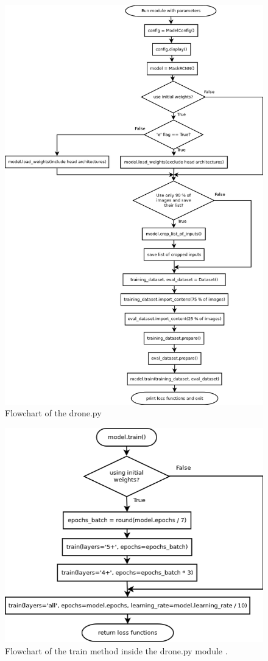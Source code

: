 \begin{figure}[H]
  \centering
  \includegraphics[width=0.8\linewidth]{images/drone-graph.png}
  \caption{Flowchart of the drone.py}
 \end{figure}
 \label{fig:drone}
 \clearpage

 \begin{figure}[H]
  \centering
  \includegraphics[width=0.8\linewidth]{images/train-graph.png}
  \caption{Flowchart of the train method inside the drone.py module .}
 \end{figure}
 \label{train}
 \clearpage

